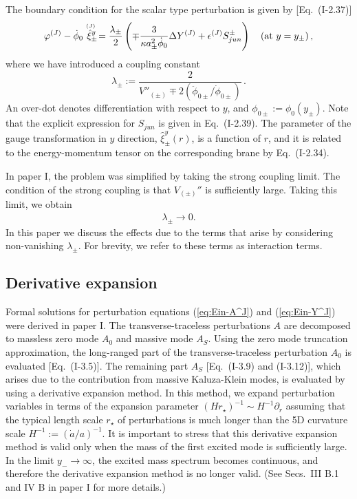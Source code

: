 \documentclass[a4paper,showpacs,preprintnumbers,amsmath,amssymb]{revtex4}
\begin{document}
The boundary condition for the scalar type perturbation is given by [Eq.~(I-2.37)] 
\begin{eqnarray}
 \varphi^{(J)} - \dot\phi_{0 }   
 \stackrel{\scriptscriptstyle {(J)~}}{\hat\xi_{\pm}^y}
 = 
 \frac{\lambda_{\pm}}{2}
 \left(
  \mp \frac{3}{ \kappa a_\pm^2 \dot\phi_{0 }}
     \Delta  Y^{(J)}
   + \epsilon^{(J)}  S^{ \pm }_{jun} \right) 
  \quad
  ({\mathrm{at~}} y=y_\pm)
   \,,
\label{eq:Jun of varphi}
\end{eqnarray}
where we have introduced a coupling constant 
\begin{equation}
   \lambda_{\pm}
   :=\frac{2}{ V''_{(\pm)}\mp 2(\ddot\phi_{0\pm}/\dot\phi_{0\pm})} \,. 
\label{eq:lambdadef}
\end{equation}
An over-dot denotes differentiation with respect to $y$, and
$\phi_{0\pm}:=\phi_{0}(y_\pm)$. 
Note that the explicit expression for 
$S_{jun}$ is given in Eq.~(I-2.39). 
The parameter of the gauge transformation in $y$ direction, ${\hat\xi^y_{\pm}}(r)$, is a function of $r$, and it is related to the energy-momentum tensor on the corresponding brane by Eq.~(I-2.34). 



In paper I, the problem was simplified by taking the strong coupling limit. 
The condition of the strong coupling is that 
$V_{(\pm)}''$ is sufficiently large. 
Taking this limit, we obtain 
\begin{eqnarray}
    \lambda_{\pm} \to 0 .
\label{eq:large limit}
\end{eqnarray}
In this paper we discuss the effects due to the terms that arise by considering non-vanishing $\lambda_\pm$.  
For brevity, we refer to these terms as interaction terms. 


\subsection{Derivative expansion}

Formal solutions for perturbation equations (\ref{eq:Ein-A^J}) and (\ref{eq:Ein-Y^J}) were derived in
paper I. 
The transverse-traceless perturbations $A$ are decomposed to massless zero mode $A_0$ and massive mode $A_S$.
Using the zero mode truncation approximation, the long-ranged part of the transverse-traceless perturbation $A_0$ is evaluated [Eq.~(I-3.5)]. The remaining part $A_S$ [Eq.~(I-3.9) and (I-3.12)], which arises due to the contribution from massive Kaluza-Klein modes, is evaluated by using a derivative expansion method.  In this method, we expand perturbation variables in terms of the expansion parameter $(H r_\star)^{-1} \sim H^{-1} \partial_r$ assuming that the typical length scale $r_\star$ of perturbations is much longer than the 5D curvature scale $H^{-1}:=(\dot a/a)^{-1}$. 
It is important to stress that this derivative expansion method is valid only when the mass of the first excited mode is sufficiently large. In the limit $y_- \to \infty$, the excited mass spectrum becomes continuous, and therefore the derivative expansion method is no longer valid. 
(See Secs.~III B.1 and IV B in paper I for more details.)
\end{document}
